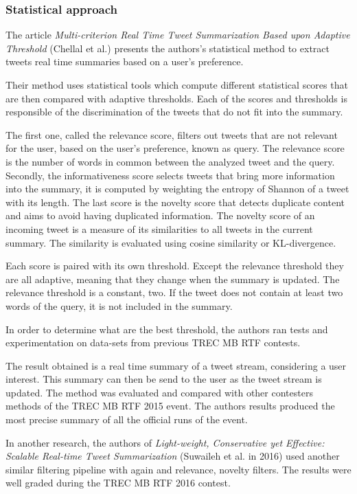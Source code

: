 \documentclass[runningheads]{llncs}
\begin{document}
\subsubsection{Statistical approach}

The article \textit{Multi-criterion Real Time Tweet Summarization Based upon
Adaptive Threshold} (Chellal et al.) \cite{chellal_multi-criterion_2016}
presents the authors's statistical method to extract tweets real time summaries
based on a user's preference.

Their method uses statistical tools which compute different statistical scores
that are then compared with adaptive thresholds. Each of the scores and
thresholds is responsible of the discrimination of the tweets that do not fit
into the summary.

The first one, called the relevance score, filters out tweets that are not
relevant for the user, based on the user's preference, known as query. The
relevance score is the number of words in common between the analyzed tweet and
the query. Secondly, the informativeness score selects tweets that bring more
information into the summary, it is computed by weighting the entropy of
Shannon of a tweet with its length. The last score is the novelty score that
detects duplicate content and aims to avoid having duplicated information. The
novelty score of an incoming tweet is a measure of its similarities to all
tweets in the current summary. The similarity is evaluated using cosine
similarity or KL-divergence.

Each score is paired with its own threshold. Except the relevance threshold
they are all adaptive, meaning that they change when the summary is updated.
The relevance threshold is a constant, two. If the tweet does not contain at
least two words of the query, it is not included in the summary.

In order to determine what are the best threshold, the authors ran tests and
experimentation on data-sets from previous TREC MB RTF contests.

The result obtained is a real time summary of a tweet stream, considering a
user interest. This summary can then be send to the user as the tweet stream is
updated. The method was evaluated and compared with other contesters methods of
the TREC MB RTF 2015 event. The authors results produced the most precise
summary of all the official runs of the event.

In another research, the authors of \textit{Light-weight, Conservative yet
Effective: Scalable Real-time Tweet Summarization} (Suwaileh et al. in 2016)
\cite{suwaileh_light-weight_nodate} used another similar filtering pipeline
with again and relevance, novelty filters. The results were well graded during
the TREC MB RTF 2016 contest.
\end{document}
